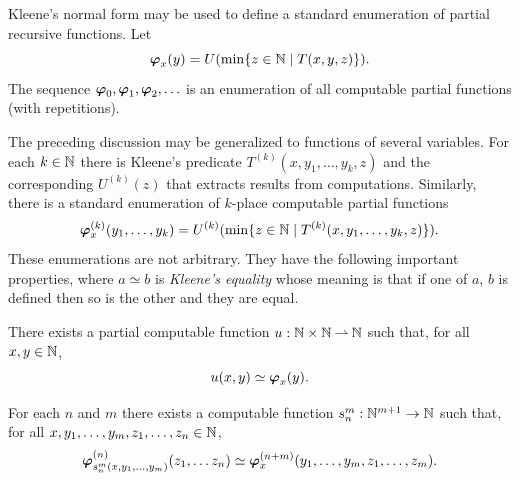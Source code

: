 Kleene's normal form may be used to define a standard enumeration of
partial recursive functions. Let
%
\begin{equation*}
  \text{\boldmath{$\varphi$}}_{x}(y) = U(\min \{z \in \mathbb{N} \mid T(x,y,z)\}).
\end{equation*}
%
The sequence $\text{\boldmath{$\varphi$}}_0, \text{\boldmath{$\varphi$}}_1, \text{\boldmath{$\varphi$}}_2, \ldots$ is an enumeration of all
computable partial functions (with repetitions).

The preceding discussion may be generalized to functions of several
variables. For each $k \in \mathbb{N}$ there is Kleene's predicate
$T^{(k)}(x,y_1,\ldots,y_k,z)$ and the corresponding $U^{(k)}(z)$ that
extracts results from computations. Similarly, there is a standard
enumeration of $k$-place computable partial functions
%
\begin{equation*}
  \text{\boldmath{$\varphi$}}^{(k)}_{x}(y_1, \ldots, y_k) =
  U^{(k)}(\min \{z \in \mathbb{N} \mid T^{(k)}(x,y_1, \ldots, y_k,z)\}).
\end{equation*}
%
These enumerations are not arbitrary. They have the following
important properties, where $a \simeq b$ is \emph{Kleene's equality}
whose meaning is that if one of $a$, $b$ is defined then so is the
other and they are equal.

\begin{theorem}[utm]
  There exists a partial computable function $u : \mathbb{N} \times
  \mathbb{N} \mathbin{\rightharpoonup} \mathbb{N}$ such that, for all $x, y \in \mathbb{N}$,
  \begin{equation*}
    u(x,y) \simeq \text{\boldmath{$\varphi$}}_{x}(y).
  \end{equation*}
\end{theorem}

\begin{theorem}[smn]
  For each $n$ and $m$ there exists a computable function $s_n^m :
  \mathbb{N}^{m+1} \to \mathbb{N}$ such that, for all $x, y_1, \ldots, y_m, z_1,
  \ldots, z_n \in \mathbb{N}$,
  \begin{equation*}
    \text{\boldmath{$\varphi$}}^{(n)}_{s_n^m(x,y_1, \ldots, y_m)}(z_1, \ldots z_n) \simeq
    \text{\boldmath{$\varphi$}}^{(n+m)}_{x}(y_1, \ldots, y_m, z_1, \ldots, z_m).
  \end{equation*}
\end{theorem}

